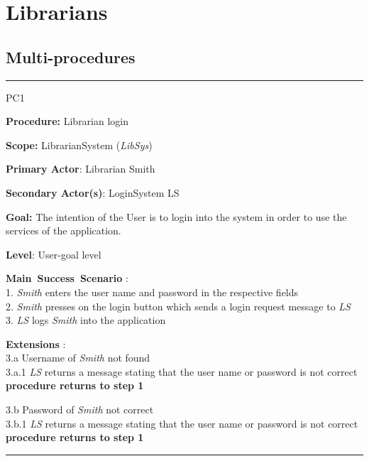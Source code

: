 \section{Librarians}
\label{chap:usage_guide}

\subsection{Multi-procedures}

\vspace{0.5cm}
\hrule
\begin{lyxlist}{PC1}
\small{
\item [\textbf{Procedure:}] Librarian login 
\item [\textbf{Scope:}] LibrarianSystem (\emph{LibSys})
\item [\textbf{Primary Actor}:] Librarian Smith
\item [\textbf{Secondary Actor(s)}:] LoginSystem LS
\item [\textbf{Goal:}] The intention of the User is to login into the
system in order to use the services of the application.
\item [\textbf{Level}:] User-goal level
\item [\textbf{Main~Success~Scenario}]:\\
1. \emph{Smith} enters the user name and password in the respective fields\\
2. \emph{Smith} presses on the login button which sends a login request message
to \emph{LS}\\
3. \emph{LS} logs \emph{Smith} into the application\\


\item [\textbf{Extensions}]:\\
3.a Username of \emph{Smith} not found\\
\hspace*{0.5cm} 3.a.1 \emph{LS} returns a message stating that the user name
or password is not correct \\
\hspace*{0.5cm} \textbf{procedure returns to step 1}

3.b Password of \emph{Smith} not correct \\
\hspace*{0.5cm} 3.b.1 \emph{LS} returns a message stating that the user name
or password is not correct \\
\hspace*{0.5cm} \textbf{procedure returns to step 1}

}

\end{lyxlist}
\hrule

